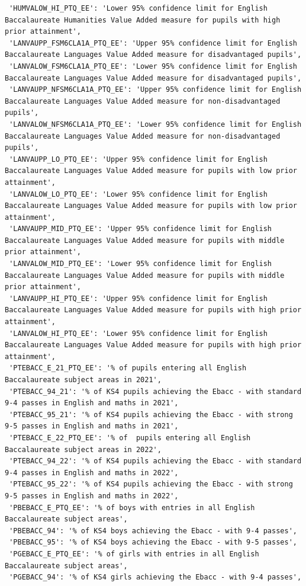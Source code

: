 \documentclass[
  letterpaper,
  DIV=11,
  numbers=noendperiod]{scrartcl}
\begin{document}
\begin{verbatim}
 'HUMVALOW_HI_PTQ_EE': 'Lower 95% confidence limit for English Baccalaureate Humanities Value Added measure for pupils with high prior attainment',
 'LANVAUPP_FSM6CLA1A_PTQ_EE': 'Upper 95% confidence limit for English Baccalaureate Languages Value Added measure for disadvantaged pupils',
 'LANVALOW_FSM6CLA1A_PTQ_EE': 'Lower 95% confidence limit for English Baccalaureate Languages Value Added measure for disadvantaged pupils',
 'LANVAUPP_NFSM6CLA1A_PTQ_EE': 'Upper 95% confidence limit for English Baccalaureate Languages Value Added measure for non-disadvantaged pupils',
 'LANVALOW_NFSM6CLA1A_PTQ_EE': 'Lower 95% confidence limit for English Baccalaureate Languages Value Added measure for non-disadvantaged pupils',
 'LANVAUPP_LO_PTQ_EE': 'Upper 95% confidence limit for English Baccalaureate Languages Value Added measure for pupils with low prior attainment',
 'LANVALOW_LO_PTQ_EE': 'Lower 95% confidence limit for English Baccalaureate Languages Value Added measure for pupils with low prior attainment',
 'LANVAUPP_MID_PTQ_EE': 'Upper 95% confidence limit for English Baccalaureate Languages Value Added measure for pupils with middle prior attainment',
 'LANVALOW_MID_PTQ_EE': 'Lower 95% confidence limit for English Baccalaureate Languages Value Added measure for pupils with middle prior attainment',
 'LANVAUPP_HI_PTQ_EE': 'Upper 95% confidence limit for English Baccalaureate Languages Value Added measure for pupils with high prior attainment',
 'LANVALOW_HI_PTQ_EE': 'Lower 95% confidence limit for English Baccalaureate Languages Value Added measure for pupils with high prior attainment',
 'PTEBACC_E_21_PTQ_EE': '% of pupils entering all English Baccalaureate subject areas in 2021',
 'PTEBACC_94_21': '% of KS4 pupils achieving the Ebacc - with standard 9-4 passes in English and maths in 2021',
 'PTEBACC_95_21': '% of KS4 pupils achieving the Ebacc - with strong 9-5 passes in English and maths in 2021',
 'PTEBACC_E_22_PTQ_EE': '% of  pupils entering all English Baccalaureate subject areas in 2022',
 'PTEBACC_94_22': '% of KS4 pupils achieving the Ebacc - with standard 9-4 passes in English and maths in 2022',
 'PTEBACC_95_22': '% of KS4 pupils achieving the Ebacc - with strong 9-5 passes in English and maths in 2022',
 'PBEBACC_E_PTQ_EE': '% of boys with entries in all English Baccalaureate subject areas',
 'PBEBACC_94': '% of KS4 boys achieving the Ebacc - with 9-4 passes',
 'PBEBACC_95': '% of KS4 boys achieving the Ebacc - with 9-5 passes',
 'PGEBACC_E_PTQ_EE': '% of girls with entries in all English Baccalaureate subject areas',
 'PGEBACC_94': '% of KS4 girls achieving the Ebacc - with 9-4 passes',

\end{verbatim}
\end{document}
